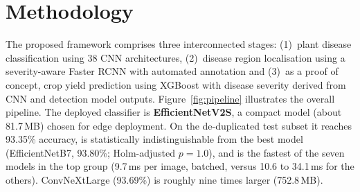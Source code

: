 \section{Methodology}
\label{sec:method}

The proposed framework comprises three interconnected stages:
(1)~plant disease classification using 38 CNN architectures,
(2)~disease region localisation using a severity-aware Faster RCNN
with automated annotation and
(3)~as a proof of concept, crop yield prediction using XGBoost with
disease severity derived from CNN and detection model outputs.
Figure~\ref{fig:pipeline} illustrates the overall pipeline.
The deployed classifier is \textbf{EfficientNetV2S}, a compact model (about 81.7\,MB) chosen for edge deployment. On the de-duplicated test subset it reaches 93.35\% accuracy, is statistically indistinguishable from the best model (EfficientNetB7, 93.80\%; Holm-adjusted $p=1.0$), and is the fastest of the seven models in the top group (9.7\,ms per image, batched, versus 10.6 to 34.1\,ms for the others). ConvNeXtLarge (93.69\%) is roughly nine times larger (752.8\,MB).

